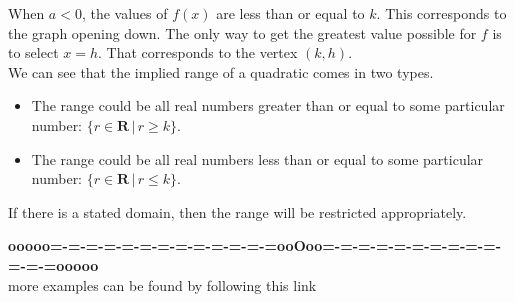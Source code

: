 \documentclass{ximera}
\begin{document}
When $a<0$, the values of $f(x)$ are less than or equal to $k$. This corresponds to the graph opening down.  The only way to get the greatest value possible for $f$ is to select $x = h$. That corresponds to the vertex $(k, h)$.  \\

We can see that the implied range of a quadratic comes in two types.  

\begin{itemize}
\item The range could be all real numbers greater than or equal to some particular number:  $\{ r \in \textbf{R} \, | \, r \geq k \}$.
\item The range could be all real numbers less than or equal to some particular number:  $\{ r \in \textbf{R} \, | \, r \leq k \}$.
\end{itemize}

If there is a stated domain, then the range will be restricted appropriately. \\










\begin{center}
\textbf{\textcolor{green!50!black}{ooooo=-=-=-=-=-=-=-=-=-=-=-=-=ooOoo=-=-=-=-=-=-=-=-=-=-=-=-=ooooo}} \\

more examples can be found by following this link\\ 

\end{center}
\end{document}
